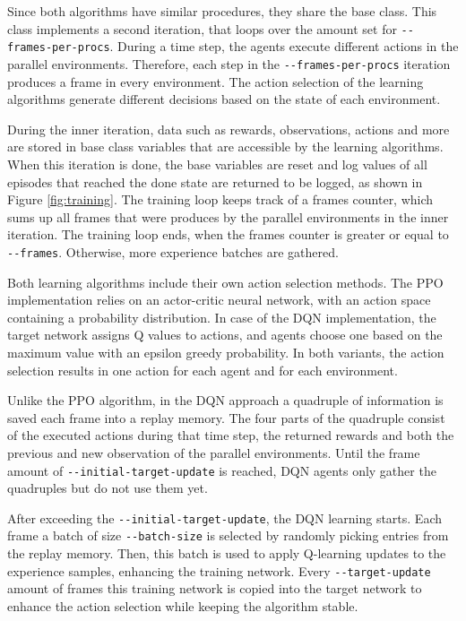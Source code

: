Since both algorithms have similar procedures, they share the base class. This class implements a second iteration, that loops over the amount set for \verb|--frames-per-procs|. During a time step, the agents execute different actions in the parallel environments. Therefore, each step in the \verb|--frames-per-procs| iteration produces a frame in every environment. The action selection of the learning algorithms generate different decisions based on the state of each environment.

During the inner iteration, data such as rewards, observations, actions and more are stored in base class variables that are accessible by the learning algorithms. When this iteration is done, the base variables are reset and log values of all episodes that reached the done state are returned to be logged, as shown in Figure \ref{fig:training}. The training loop keeps track of a frames counter, which sums up all frames that were produces by the parallel environments in the inner iteration. The training loop ends, when the frames counter is greater or equal to \verb|--frames|. Otherwise, more experience batches are gathered.

Both learning algorithms include their own action selection methods. The PPO implementation relies on an actor-critic neural network, with an action space containing a probability distribution. In case of the DQN implementation, the target network assigns Q values to actions, and agents choose one based on the maximum value with an epsilon greedy probability. In both variants, the action selection results in one action for each agent and for each environment.

Unlike the PPO algorithm, in the DQN approach a quadruple of information is saved each frame into a replay memory. The four parts of the quadruple consist of the executed actions during that time step, the returned rewards and both the previous and new observation of the parallel environments. Until the frame amount of \verb|--initial-target-update| is reached, DQN agents only gather the quadruples but do not use them yet.

After exceeding the \verb|--initial-target-update|, the DQN learning starts. Each frame a batch of size \verb|--batch-size| is selected by randomly picking entries from the replay memory. Then, this batch is used to apply Q-learning updates to the experience samples, enhancing the training network. Every \verb|--target-update| amount of frames this training network is copied into the target network to enhance the action selection while keeping the algorithm stable.

